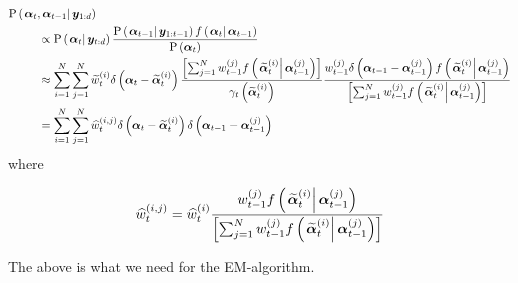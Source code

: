 \begin{equation}\begin{split}
\propC{\vec{\alpha}_t, \vec{\alpha}_{t-1}}{\vec{y}_{1:d}} \hspace{-50pt} & \hspace{50pt} \\
%
& \propto 
	\propC{\vec{\alpha}_t}{\vec{y}_{t:d}}
	\frac{
		\propC{\vec{\alpha}_{t-1}}{\vec{y}_{1:{t-1}}}
		\optorC{f}{\vec{\alpha}_t}{\vec{\alpha}_{t - 1}}
	}{ \prop{\vec{\alpha}_t} } \\
%
& \approx \sum_{i=1}^N\sum_{j=1}^N
	\particB{w}{t}{i}
	\dirac{\vec{\alpha}_t - \particB{\vec{\alpha}}{t}{i}}
	\frac{
		\Lbrac{\sum_{j = 1}^N
		\partic{w}{t -1}{j}
		\optorC{f}{\particB{\vec{\alpha}}{t}{i}}{\partic{\vec{\alpha}}{t - 1}{j}}}
	}{ \optor{\gamma_t}{\particB{\vec{\alpha}}{t}{i}} }
	\frac{
		\partic{w}{t -1}{j}
		\dirac{\vec{\alpha}_{t -1} - \partic{\vec{\alpha}}{t - 1}{j}}
		\optorC{f}{\particB{\vec{\alpha}}{t}{i}}{\partic{\vec{\alpha}}{t - 1}{j}}
	}{
		\Lbrac{\sum_{j = 1}^N
		\partic{w}{t -1}{j}
		\optorC{f}{\particB{\vec{\alpha}}{t}{i}}{\partic{\vec{\alpha}}{t - 1}{j}}}
	} \\
%
& = \sum_{i=1}^N\sum_{j=1}^N
	\particS{w}{t}{i,j} 
	\dirac{\vec{\alpha}_t - \particB{\vec{\alpha}}{t}{i}}
	\dirac{\vec{\alpha}_{t -1} - \partic{\vec{\alpha}}{t - 1}{j}} \\
\end{split}\end{equation}
%
%
where 

\begin{equation}
\particS{w}{t}{i,j} = \particS{w}{t}{i} 
	\frac{
		\partic{w}{t -1}{j}
		\optorC{f}{\particB{\vec{\alpha}}{t}{i}}{\partic{\vec{\alpha}}{t - 1}{j}}
	}{
		\Lbrac{\sum_{j = 1}^N
		\partic{w}{t -1}{j}
		\optorC{f}{\particB{\vec{\alpha}}{t}{i}}{\partic{\vec{\alpha}}{t - 1}{j}}}
	}
\end{equation}

The above is what we need for the EM-algorithm.

